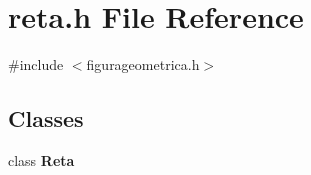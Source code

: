 \section{reta.\+h File Reference}
\label{reta_8h}
{\ttfamily \#include $<$figurageometrica.\+h$>$}\newline
\subsection*{Classes}
\begin{DoxyCompactItemize}
\item 
class \textbf{ Reta}
\end{DoxyCompactItemize}
